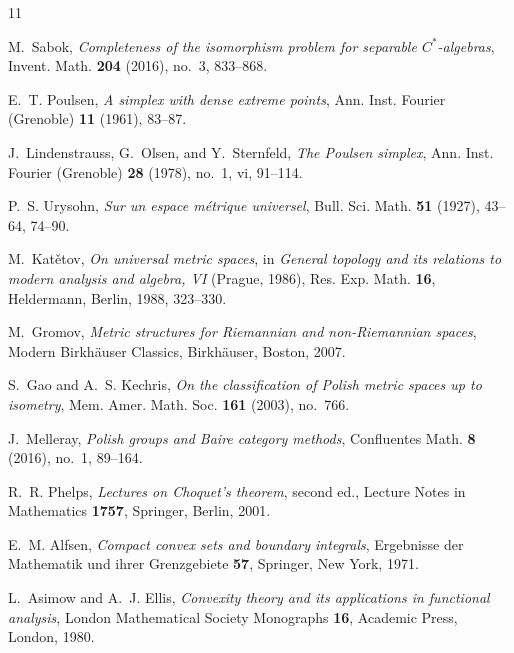 \documentclass{proc-l}
\numberwithin{equation}{section}
\theoremstyle{definition}
\theoremstyle{remark}
\begin{document}
\begin{thebibliography}{11}

M.~Sabok,
\emph{Completeness of the isomorphism problem for separable \(C^*\)-algebras},
Invent. Math. \textbf{204} (2016), no.~3, 833--868.

E.~T. Poulsen,
\emph{A simplex with dense extreme points},
Ann. Inst. Fourier (Grenoble) \textbf{11} (1961), 83--87.

J.~Lindenstrauss, G.~Olsen, and Y.~Sternfeld,
\emph{The Poulsen simplex},
Ann. Inst. Fourier (Grenoble) \textbf{28} (1978), no.~1, vi, 91--114.

P.~S. Urysohn,
\emph{Sur un espace m\'etrique universel},
Bull. Sci. Math. \textbf{51} (1927), 43--64, 74--90.

M.~Kat\v{e}tov,
\emph{On universal metric spaces},
in \emph{General topology and its relations to modern analysis and algebra, VI}
(Prague, 1986), Res. Exp. Math. \textbf{16}, Heldermann, Berlin, 1988,
323--330.

M.~Gromov,
\emph{Metric structures for Riemannian and non-Riemannian spaces},
Modern Birkh\"auser Classics, Birkh\"auser, Boston, 2007.

S.~Gao and A.~S. Kechris,
\emph{On the classification of Polish metric spaces up to isometry},
Mem. Amer. Math. Soc. \textbf{161} (2003), no.~766.

J.~Melleray,
\emph{Polish groups and Baire category methods},
Confluentes Math. \textbf{8} (2016), no.~1, 89--164.

R.~R. Phelps,
\emph{Lectures on Choquet's theorem},
second ed., Lecture Notes in Mathematics \textbf{1757}, Springer, Berlin, 2001.

E.~M. Alfsen,
\emph{Compact convex sets and boundary integrals},
Ergebnisse der Mathematik und ihrer Grenzgebiete \textbf{57}, Springer,
New York, 1971.

L.~Asimow and A.~J. Ellis,
\emph{Convexity theory and its applications in functional analysis},
London Mathematical Society Monographs \textbf{16}, Academic Press, London,
1980.

\end{thebibliography}
\end{document}
